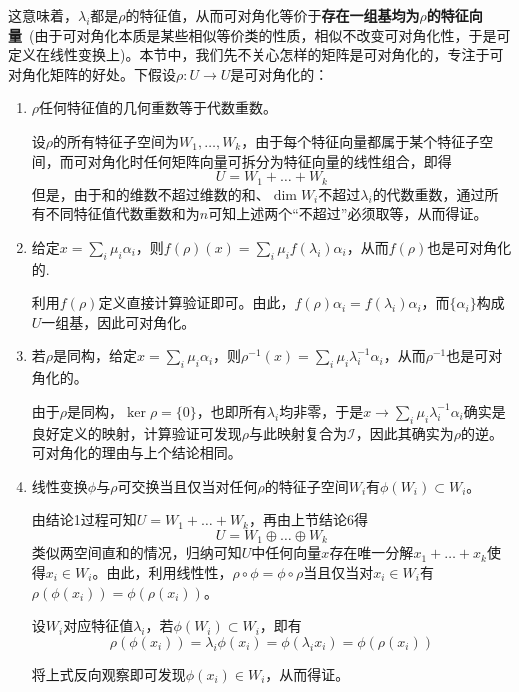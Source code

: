 \documentclass[a4paper,UTF8,fontset=windows]{ctexart}
\newcommand*{\mi}{\mathcal{I}}
\begin{document}
这意味着，$\lambda_i$都是$\rho$的特征值，从而可对角化等价于\textbf{存在一组基均为$\rho$的特征向量}\ (由于可对角化本质是某些相似等价类的性质，相似不改变可对角化性，于是可定义在线性变换上)。本节中，我们先不关心怎样的矩阵是可对角化的，专注于可对角化矩阵的好处。下假设$\rho:U\to U$是可对角化的：
\begin{enumerate}
    \item $\rho$任何特征值的几何重数等于代数重数。
    
    设$\rho$的所有特征子空间为$W_1,\dots,W_k$，由于每个特征向量都属于某个特征子空间，而可对角化时任何矩阵向量可拆分为特征向量的线性组合，即得
    $$U=W_1+\dots+W_k$$
    但是，由于和的维数不超过维数的和、$\dim W_i$不超过$\lambda_i$的代数重数，通过所有不同特征值代数重数和为$n$可知上述两个``不超过''必须取等，从而得证。
    
    \item 给定$x=\sum_i\mu_i\alpha_i$，则$f(\rho)(x)=\sum_i\mu_if(\lambda_i)\alpha_i$，从而$f(\rho)$也是可对角化的.
    
    利用$f(\rho)$定义直接计算验证即可。由此，$f(\rho)\alpha_i=f(\lambda_i)\alpha_i$，而$\{\alpha_i\}$构成$U$一组基，因此可对角化。
    
    \item 若$\rho$是同构，给定$x=\sum_i\mu_i\alpha_i$，则$\rho^{-1}(x)=\sum_i\mu_i\lambda_i^{-1}\alpha_i$，从而$\rho^{-1}$也是可对角化的。
    
    由于$\rho$是同构，$\ker\rho=\{0\}$，也即所有$\lambda_i$均非零，于是$x\to\sum_i\mu_i\lambda_i^{-1}\alpha_i$确实是良好定义的映射，计算验证可发现$\rho$与此映射复合为$\mi$，因此其确实为$\rho$的逆。可对角化的理由与上个结论相同。
    
    \item 线性变换$\phi$与$\rho$可交换当且仅当对任何$\rho$的特征子空间$W_i$有$\phi(W_i)\subset W_i$。
    
    由结论1过程可知$U=W_1+\dots+W_k$，再由上节结论6得
    $$U=W_1\oplus\dots\oplus W_k$$
    类似两空间直和的情况，归纳可知$U$中任何向量$x$存在唯一分解$x_1+\dots+x_k$使得$x_i\in W_i$。由此，利用线性性，$\rho\circ\phi=\phi\circ\rho$当且仅当对$x_i\in W_i$有$\rho(\phi(x_i))=\phi(\rho(x_i))$。

    设$W_i$对应特征值$\lambda_i$，若$\phi(W_i)\subset W_i$，即有
    $$\rho(\phi(x_i))=\lambda_i\phi(x_i)=\phi(\lambda_ix_i)=\phi(\rho(x_i))$$

    将上式反向观察即可发现$\phi(x_i)\in W_i$，从而得证。
\end{enumerate}
\end{document}
